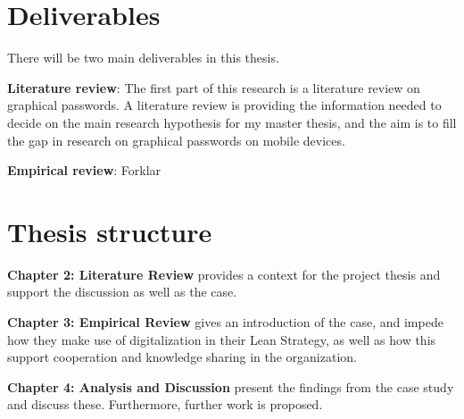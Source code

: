 \section{Deliverables} \label{sec:deliverables}
There will be two main deliverables in this thesis.

{\noindent \bf Literature review}: The first part of this research is a literature review on graphical passwords. A literature review is providing the information needed to decide on the main research hypothesis for my master thesis, and the aim is to fill the gap in research on graphical passwords on mobile devices.

{\noindent \bf Empirical review}: Forklar

\section{Thesis structure} \label{sec:thesis}

{\noindent \bf Chapter 2: Literature Review} provides a context for the project thesis and support the discussion as well as the case.

{\noindent \bf Chapter 3: Empirical Review} gives an introduction of the case, and impede how they make use of digitalization in their Lean Strategy, as well as how this support cooperation and knowledge sharing in the organization.

{\noindent \bf Chapter 4: Analysis and Discussion} present the findings from the case study and discuss these. Furthermore, further work is proposed. 


\cleardoublepage